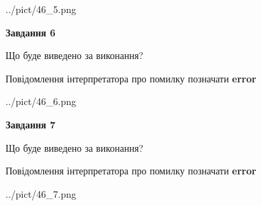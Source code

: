\documentclass[10pt, ukrainian]{article}
\begin{document}
{\begin {large}
\begin{center}
	{../pict/46_5.png}
\end{center}
\newpage

{\begin {center}\textbf{Завдання 6}\end {center}}\par
Що буде виведено за виконання? \par
Повідомлення інтерпретатора про помилку позначати \textbf{error}

\begin{center}
	{../pict/46_6.png}
\end{center}
\newpage

{\begin {center}\textbf{Завдання 7}\end {center}}\par
Що буде виведено за виконання? \par
Повідомлення інтерпретатора про помилку позначати \textbf{error}

\begin{center}
	{../pict/46_7.png}
\end{center}
\newpage

\end {large}}
\end{document}
